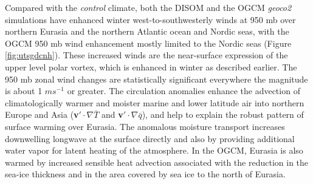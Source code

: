 \documentclass[12pt]{article}
\begin{document}
Compared with the \textit{control} climate, both the DISOM and the OGCM \textit{geoco2} simulations have enhanced winter west-to-southwesterly winds at 950 mb over northern Eurasia and the northern Atlantic ocean and Nordic seas, with the OGCM 950 mb wind enhancement mostly limited to the Nordic seas (Figure \ref{fig:utsgdcnh}). These increased winds are the near-surface expression of the upper level polar vortex, which is enhanced in winter as described earlier. The 950 mb zonal wind changes are statistically significant  everywhere the magnitude is about 1 $ms^{-1}$ or greater. The circulation anomalies enhance the advection of climatologically warmer and moister marine and lower latitude air into northern Europe and Asia (\textbf{v}$' \cdot \nabla \bar{T} $ and \textbf{v}$' \cdot \nabla \bar{q} $), and help to explain the robust pattern of surface warming over Eurasia. The anomalous moisture transport increases downwelling longwave at the surface directly and also by providing additional water vapor for latent heating of the atmosphere. In the OGCM, Eurasia is also warmed by increased sensible heat advection associated with the reduction in the sea-ice thickness and in the area covered by sea ice to the north of Eurasia. 
\end{document}
